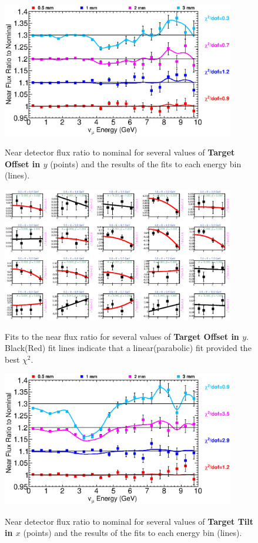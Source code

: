\begin{figure}[ht]
  \begin{center}
    {\includegraphics[width=4.0in]{figures/TargetYOffset_near_summary.eps}}
  \end{center}
\caption{ Near detector flux ratio to nominal for several values of {\bf Target Offset in $y$} (points) and the results of the fits to each energy bin (lines).}
\end{figure}

\begin{figure}[hb]
  \begin{center}
    {\includegraphics[width=4.0in]{figures/TargetYOffset_near_fits.eps}}
  \end{center}
\caption{ Fits to the near flux ratio for several values of {\bf Target Offset in $y$}. Black(Red) fit lines indicate that a linear(parabolic) fit provided the best $\chi^2$. }
\end{figure}

\begin{figure}[ht]
  \begin{center}
    {\includegraphics[width=4.0in]{figures/TargetXTilt_near_summary.eps}}
  \end{center}
\caption{ Near detector flux ratio to nominal for several values of {\bf Target Tilt in $x$} (points) and the results of the fits to each energy bin (lines).}
\end{figure}

